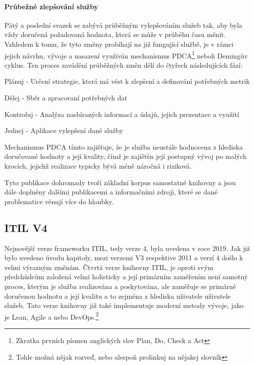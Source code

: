 \documentclass[
  digital,     %
  twoside,     %
  lof,         %
  lot,         %
]{fithesis4}
\begin{document}
\paragraph{Průbežné zlepšování služby}
Pátý a poslední svazek se zabývá průběžným vylepšováním služeb tak, aby byla vždy doručená požadovaná hodnota, která se může v průběhu času měnit. Vzhledem k tomu, že tyto změny probíhají na již fungující službě, je v rámci jejich návrhu, vývoje a nasazení využíván mechanismus PDCA\footnote{Zkratka prvních písmen anglických slov Plan, Do, Check a Act} neboli Demingův cyklus. Ten proces zavádění průběžných změn dělí do čtyřech následujících fází: \parencite[s.~38]{Matula2017}
\begin{compactitem}
    \item Plánuj - Určení strategie, která má vést k zlepšení a definování potřebných metrik
    \item Dělej - Sběr a zpracovaní potřebných dat
    \item Kontroluj - Analýza nasbíraných informací a údajů, jejich prezentace a využití
    \item Jednej - Aplikace vylepšení dané služby
\end{compactitem}
Mechanismus PDCA tímto zajišťuje, že je služba neustále hodnocena z hlediska doručované hodnoty a její kvality, čímž je zajištěn její postupný vývoj po malých krocích, jejichž realizace typicky bývá méně náročná i riziková. 

Tyto publikace dohromady tvoří základní korpus samostatné knihovny a jsou dále doplněny dalšími publikacemi a informačními zdroji, které se dané problematice věnují více do hloubky. \parencite[s.~8]{Carlidge2007}

\subsection{ITIL V4}
Nejnovější verze frameworku ITIL, tedy verze 4, byla uvedena v roce 2019. Jak již bylo uvedeno úvodu kapitoly, mezi verzemi V3 respektive 2011 a verzí 4 došlo k velmi výrazným změnám. Čtvrtá verze knihovny ITIL, je oproti svým předchůdcům založená velmi holisticky a její primárním zaměřením není samotný proces, kterým je služba realizována a poskytována, ale zaměřuje se primárně doručenou hodnotu a její kvalitu a to zejména z hlediska uživatele uživatele služeb. Tato verze knihovny již také implementuje moderní metody vývoje, jako je Lean, Agile a nebo DevOps.\footnote{Tohle možná nějak rozveď, nebo alespoň prolinkuj na nějakej slovník} \parencite[s.~7]{Cartlidge2020}
\end{document}

